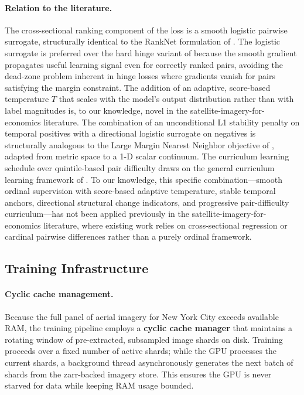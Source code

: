 \documentclass{article}
\begin{document}
\paragraph{Relation to the literature.} The cross-sectional ranking component of the loss is a smooth logistic pairwise surrogate, structurally identical to the RankNet formulation of \citet{burges2005learning}. The logistic surrogate is preferred over the hard hinge variant of \citet{joachims2002optimizing} because the smooth gradient propagates useful learning signal even for correctly ranked pairs, avoiding the dead-zone problem inherent in hinge losses where gradients vanish for pairs satisfying the margin constraint. The addition of an adaptive, score-based temperature $T$ that scales with the model's output distribution rather than with label magnitudes is, to our knowledge, novel in the satellite-imagery-for-economics literature. The combination of an unconditional L1 stability penalty on temporal positives with a directional logistic surrogate on negatives is structurally analogous to the Large Margin Nearest Neighbor objective of \citet{weinberger2009distance}, adapted from metric space to a 1-D scalar continuum. The curriculum learning schedule over quintile-based pair difficulty draws on the general curriculum learning framework of \citet{bengio2009curriculum}. To our knowledge, this specific combination---smooth ordinal supervision with score-based adaptive temperature, stable temporal anchors, directional structural change indicators, and progressive pair-difficulty curriculum---has not been applied previously in the satellite-imagery-for-economics literature, where existing work relies on cross-sectional regression \citep{jean2016combining} or cardinal pairwise differences \citep{yeh2020using} rather than a purely ordinal framework.

\subsection{Training Infrastructure}

\paragraph{Cyclic cache management.}
Because the full panel of aerial imagery for New York City exceeds available RAM, the training pipeline employs a \textbf{cyclic cache manager} that maintains a rotating window of pre-extracted, subsampled image shards on disk. Training proceeds over a fixed number of active shards; while the GPU processes the current shards, a background thread asynchronously generates the next batch of shards from the zarr-backed imagery store. This ensures the GPU is never starved for data while keeping RAM usage bounded.
\end{document}
